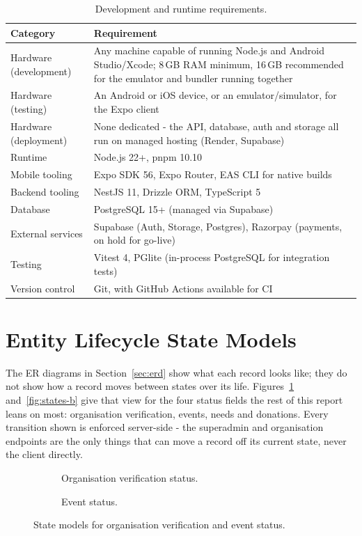 \begin{table}[H]\centering
\caption{Development and runtime requirements.}
\label{tab:sysreq}
\begin{tabularx}{\textwidth}{|p{}|X|}
\hline
\textbf{Category} & \textbf{Requirement}\\\hline
Hardware (development) & Any machine capable of running Node.js and Android Studio/Xcode; 8\,GB RAM minimum, 16\,GB recommended for the emulator and bundler running together\\\hline
Hardware (testing) & An Android or iOS device, or an emulator/simulator, for the Expo client\\\hline
Hardware (deployment) & None dedicated - the API, database, auth and storage all run on managed hosting (Render, Supabase)\\\hline
Runtime & Node.js 22+, pnpm 10.10\\\hline
Mobile tooling & Expo SDK 56, Expo Router, EAS CLI for native builds\\\hline
Backend tooling & NestJS 11, Drizzle ORM, TypeScript 5\\\hline
Database & PostgreSQL 15+ (managed via Supabase)\\\hline
External services & Supabase (Auth, Storage, Postgres), Razorpay (payments, on hold for go-live)\\\hline
Testing & Vitest 4, PGlite (in-process PostgreSQL for integration tests)\\\hline
Version control & Git, with GitHub Actions available for CI\\\hline
\end{tabularx}
\end{table}

\clearpage
\section{Entity Lifecycle State Models}
\label{sec:state-models}
The ER diagrams in Section~\ref{sec:erd} show what each record looks like; they do not show how a record moves between states over its life. Figures~\ref{fig:states-a} and~\ref{fig:states-b} give that view for the four status fields the rest of this report leans on most: organisation verification, events, needs and donations. Every transition shown is enforced server-side - the superadmin and organisation endpoints are the only things that can move a record off its current state, never the client directly.

\begin{figure}[H]
    \centering
    \begin{subfigure}[t]{0.48\textwidth}
        \centering
        \caption{Organisation verification status.}
    \end{subfigure}\hfill
    \begin{subfigure}[t]{0.48\textwidth}
        \centering
        \caption{Event status.}
    \end{subfigure}
    \caption{State models for organisation verification and event status.}
    \label{fig:states-a}
\end{figure}

